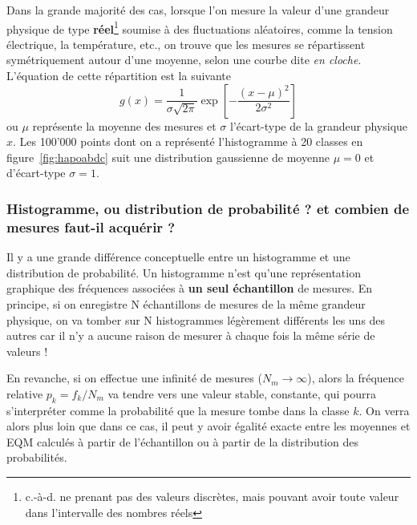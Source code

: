\documentclass[main.tex]{subfiles}
\begin{document}
Dans la grande majorité des cas, lorsque l'on mesure la valeur d'une grandeur physique de type \textbf{réel}\footnote{c.-à-d. ne prenant pas des valeurs discrètes, mais pouvant avoir toute valeur dans l'intervalle des nombres réels} soumise à des fluctuations aléatoires, comme la tension électrique, la température, etc., on trouve que les mesures se répartissent symétriquement autour d'une moyenne, selon une courbe dite \textit{en cloche}. L'équation de cette répartition est la suivante
\begin{equation}
    g(x)=\frac{1}{\sigma\sqrt{2\pi}}\exp{\left[-\frac{(x-\mu)^2}{2\sigma^2}\right]}
\end{equation}
ou $\mu$ représente la moyenne des mesures et $\sigma$ l'écart-type de la grandeur physique $x$. Les 100'000 points dont on a représenté l'histogramme à 20 classes en figure~\ref{fig:hapoabdc} suit une distribution gaussienne de moyenne $\mu=0$ et d'écart-type $\sigma=1$.

\subsubsection*{Histogramme, ou distribution de probabilité ? et combien de mesures faut-il acquérir ?}

Il y a une grande différence conceptuelle entre un histogramme et une distribution de probabilité. Un histogramme n'est qu'une représentation graphique des fréquences associées à \textbf{un seul échantillon} de mesures. En principe, si on enregistre N échantillons de mesures de la même grandeur physique, on va tomber sur N histogrammes légèrement différents les uns des autres car il n'y a aucune raison de mesurer à chaque fois la même série de valeurs !

En revanche, si on effectue une infinité de mesures ($N_m\rightarrow\infty$), alors la fréquence relative $p_k=f_k/N_m$ va tendre vers une valeur stable, constante, qui pourra s'interpréter comme la probabilité que la mesure tombe dans la classe $k$. On verra alors plus loin que dans ce cas, il peut y avoir égalité exacte entre les moyennes et EQM calculés à partir de l'échantillon ou à partir de la distribution des probabilités.
\end{document}
